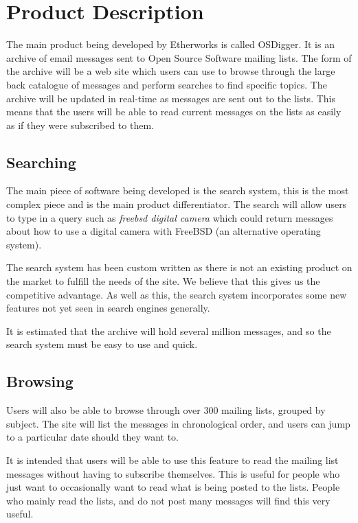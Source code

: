 \section{Product Description} 

The main product being developed by Etherworks is called OSDigger.  It is
an archive of email messages sent to Open Source Software mailing lists.  
The form of the archive will be a web site which users can use to
browse through the large back catalogue of messages and perform searches
to find specific topics.  The archive will be updated in real-time as
messages are sent out to the lists.  This means that the users will be
able to read current messages on the lists as easily as if they were
subscribed to them.

\subsection{Searching}
The main piece of software being developed is the search system, this is
the most complex piece and is the main product differentiator.  The search
will allow users to type in a query such as \emph{freebsd digital camera}
which could return messages about how to use a digital camera with FreeBSD
(an alternative operating system).

The search system has been custom written as there is not an existing
product on the market to fulfill the needs of the site.  We believe that
this gives us the competitive advantage.  As well as this, the search system incorporates some new features not yet seen in search engines generally.

It is estimated that the archive will hold several million messages, and
so the search system must be easy to use and quick.


\subsection{Browsing}
Users will also be able to browse through over 300 mailing lists, grouped by
subject.  The site will list the messages in chronological order, and
users can jump to a particular date should they want to.

It is intended that users will be able to use this feature to read the mailing list messages without having to subscribe themselves.  This is useful for people who just want to occasionally want to read what is being posted to the lists.  People who mainly read the lists, and do not post many messages will find this very useful.

